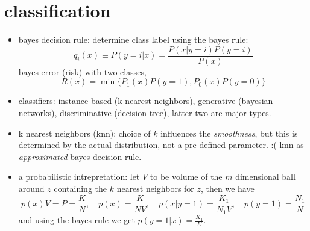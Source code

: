\documentclass{article}
\begin{document}
\section{classification}
\begin{itemize}
	\item bayes decision rule: determine class label using the bayes rule: 
		\begin{equation}
			q_i(x)\equiv P(y=i|x)=\frac{P(x|y=i)P(y=i)}{P(x)}
		\end{equation}
		bayes error (risk) with two classes, 
		\begin{equation}
			R(x)=\min\{P_1(x)P(y=1),P_0(x)P(y=0)\}
		\end{equation}
	\item classifiers: instance based (k nearest neighbors), generative (bayesian networks),
		 discriminative (decision tree), latter two are major types. 
	\item k nearest neighbors (knn): choice of $k$ influences the {\it smoothness},
		but this is determined by the actual distribution, not a pre-defined parameter. :(
		knn as {\it approximated} bayes decision rule.
	\item a probabilistic intrepretation: let $V$ to be volume of the $m$ dimensional ball
		around $z$ containing the $k$ nearest neighbors for $z$, then we have
		\begin{equation}
			p(x)V=P=\frac KN,\quad p(x)=\frac{K}{NV},\quad p(x|y=1)=\frac{K_1}{N_1V},
			\quad p(y=1)=\frac{N_1}{N}
		\end{equation}
		and using the bayes rule we get $p(y=1|x)=\frac{K_1}{K}$. 
\end{itemize}
\end{document}
